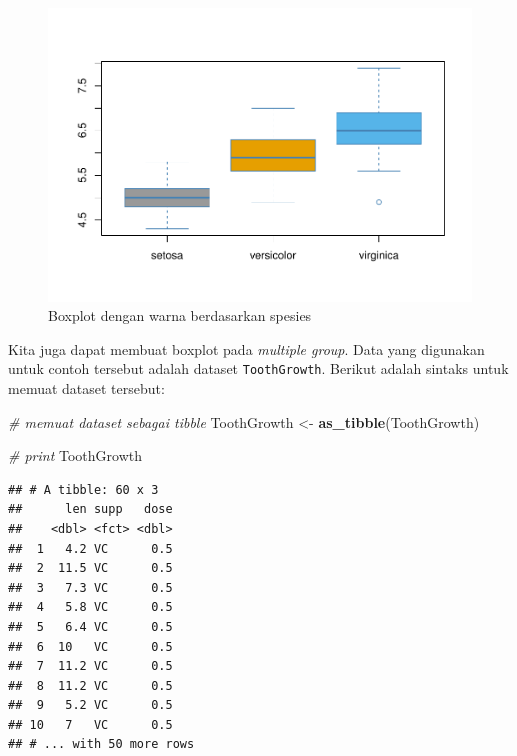 \documentclass[]{book}
\newenvironment{Shaded}{\begin{snugshade}}{\end{snugshade}}
\newcommand{\KeywordTok}[1]{\textcolor[rgb]{0.13,0.29,0.53}{\textbf{#1}}}
\newcommand{\StringTok}[1]{\textcolor[rgb]{0.31,0.60,0.02}{#1}}
\newcommand{\CommentTok}[1]{\textcolor[rgb]{0.56,0.35,0.01}{\textit{#1}}}
\newcommand{\OperatorTok}[1]{\textcolor[rgb]{0.81,0.36,0.00}{\textbf{#1}}}
\newcommand{\NormalTok}[1]{#1}
\begin{document}
\begin{figure}

{\centering \includegraphics[width=0.7\linewidth]{EnvStat_files/figure-latex/boxplot3-1} 

}

\caption{Boxplot dengan warna berdasarkan spesies}\label{fig:boxplot3}
\end{figure}

Kita juga dapat membuat boxplot pada \emph{multiple group}. Data yang
digunakan untuk contoh tersebut adalah dataset \texttt{ToothGrowth}.
Berikut adalah sintaks untuk memuat dataset tersebut:

\begin{Shaded}
\begin{Highlighting}[]
\CommentTok{# memuat dataset sebagai tibble}
\NormalTok{ToothGrowth <-}\StringTok{ }\KeywordTok{as_tibble}\NormalTok{(ToothGrowth)}

\CommentTok{# print}
\NormalTok{ToothGrowth}
\end{Highlighting}
\end{Shaded}

\begin{verbatim}
## # A tibble: 60 x 3
##      len supp   dose
##    <dbl> <fct> <dbl>
##  1   4.2 VC      0.5
##  2  11.5 VC      0.5
##  3   7.3 VC      0.5
##  4   5.8 VC      0.5
##  5   6.4 VC      0.5
##  6  10   VC      0.5
##  7  11.2 VC      0.5
##  8  11.2 VC      0.5
##  9   5.2 VC      0.5
## 10   7   VC      0.5
## # ... with 50 more rows
\end{verbatim}

\begin{Shaded}
\end{Shaded}
\end{document}
